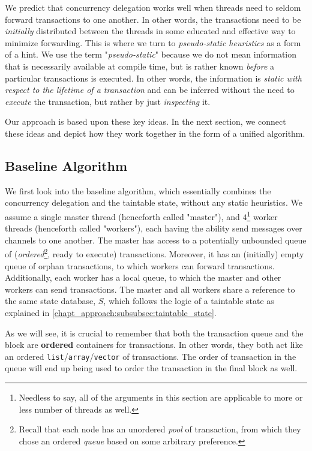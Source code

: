 We predict that concurrency delegation works well when threads need to seldom forward transactions
to one another. In other words, the transactions need to be \textit{initially} distributed between
the threads in some educated and effective way to minimize forwarding. This is where we turn to
\textit{pseudo-static heuristics} as a form of a hint. We use the term "\textit{pseudo-static}"
because we do not mean information that is necessarily available at compile time, but is rather
known \textit{before} a particular transactions is executed. In other words, the information is
\textit{static with respect to the lifetime of a transaction} and can be inferred without the need
to \textit{execute} the transaction, but rather by just \textit{inspecting} it.

Our approach is based upon these key ideas. In the next section, we connect these ideas and
depict how they work together in the form of a unified algorithm.

\subsection{Baseline Algorithm} \label{subsec:baseline_alg}

We first look into the baseline algorithm, which essentially combines the concurrency delegation and
the taintable state, without any static heuristics. We assume a single master thread (henceforth
called "master"), and $4$\footnote{Needless to say, all of the arguments in this section are
applicable to more or less number of threads as well.} worker threads (henceforth called "workers"),
each having the ability send messages over channels to one another. The master has access to a
potentially unbounded queue of (\textit{ordered}\footnote{Recall that each node has an unordered
\textit{pool} of transaction, from which they chose an ordered \textit{queue} based on some
arbitrary preference.}, ready to execute) transactions. Moreover, it has an (initially) empty queue
of orphan transactions, to which workers can forward transactions. Additionally, each worker has a
local queue, to which the master and other workers can send transactions. The master and all workers
share a reference to the same state database, $S$, which follows the logic of a taintable state as
explained in \ref{chapt_approach:subsubsec:taintable_state}.

\begin{remark}
	As we will see, it is crucial to remember that both the transaction queue and the block are
	\textbf{ordered} containers for transactions. In other words, they both act like an ordered
	\texttt{list}/\texttt{array}/\texttt{vector} of transactions. The order of transaction in the
	queue will end up being used to order the transaction in the final block as well.
\end{remark}


